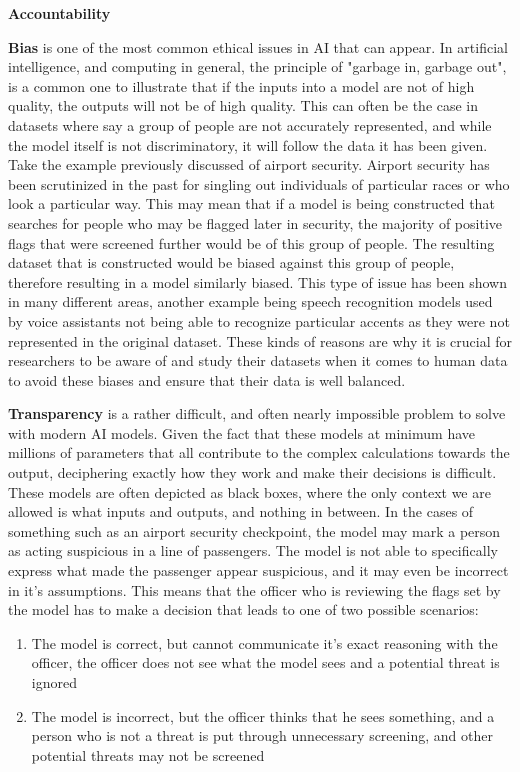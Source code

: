 \textbf{Accountability}

\textbf{Bias} is one of the most common ethical issues in AI that can appear. In artificial intelligence, and computing in general, the principle of "garbage in, garbage out", is a common one to illustrate that if the inputs into a model are not of high quality, the outputs will not be of high quality. This can often be the case in datasets where say a group of people are not accurately represented, and while the model itself is not discriminatory, it will follow the data it has been given. Take the example previously discussed of airport security. Airport security has been scrutinized in the past for singling out individuals of particular races or who look a particular way. This may mean that if a model is being constructed that searches for people who may be flagged later in security, the majority of positive flags that were screened further would be of this group of people. The resulting dataset that is constructed would be biased against this group of people, therefore resulting in a model similarly biased. This type of issue has been shown in many different areas, another example being speech recognition models used by voice assistants not being able to recognize particular accents as they were not represented in the original dataset. These kinds of reasons are why it is crucial for researchers to be aware of and study their datasets when it comes to human data to avoid these biases and ensure that their data is well balanced.

\textbf{Transparency} is a rather difficult, and often nearly impossible problem to solve with modern AI models. Given the fact that these models at minimum have millions of parameters that all contribute to the complex calculations towards the output, deciphering exactly how they work and make their decisions is difficult. These models are often depicted as black boxes, where the only context we are allowed is what inputs and outputs, and nothing in between. In the cases of something such as an airport security checkpoint, the model may mark a person as acting suspicious in a line of passengers. The model is not able to specifically express what made the passenger appear suspicious, and it may even be incorrect in it's assumptions. This means that the officer who is reviewing the flags set by the model has to make a decision that leads to one of two possible scenarios:

\begin{enumerate}
	\item The model is correct, but cannot communicate it's exact reasoning with the officer, the officer does not see what the model sees and a potential threat is ignored
	\item The model is incorrect, but the officer thinks that he sees something, and a person who is not a threat is put through unnecessary screening, and other potential threats may not be screened
\end{enumerate}

